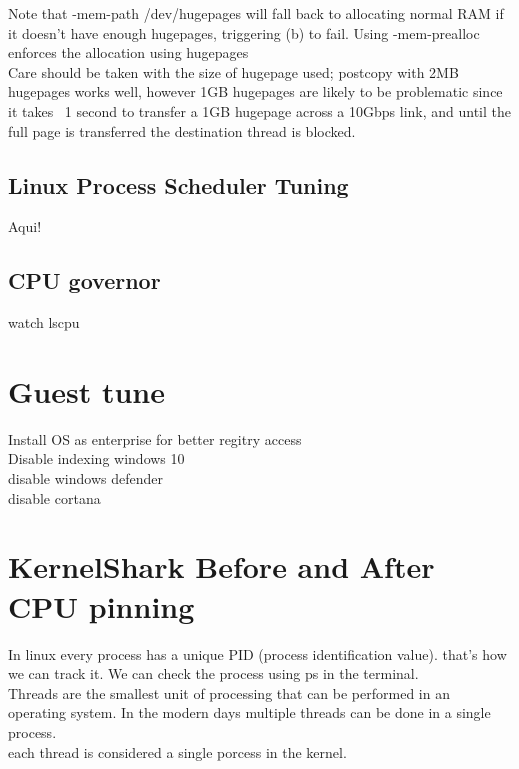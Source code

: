 \documentclass[11pt, a4paper, oneside]{article}
\theoremstyle{definition}
\begin{document}
Note that -mem-path /dev/hugepages will fall back to allocating normal RAM if it doesn’t have enough hugepages, triggering (b) to fail. Using -mem-prealloc enforces the allocation using hugepages\\

Care should be taken with the size of hugepage used; postcopy with 2MB hugepages works well, however 1GB hugepages are likely to be problematic since it takes ~1 second to transfer a 1GB hugepage across a 10Gbps link, and until the full page is transferred the destination thread is blocked.\\



\subsection{Linux Process Scheduler Tuning}

Aqui!


\subsection{CPU governor}
watch lscpu\\

\vfill
\pagebreak
\section{Guest tune}
Install OS as enterprise for better regitry access\\
Disable indexing windows 10\\
disable windows defender\\
disable cortana\\

\vfill
\pagebreak
\section{KernelShark Before and After CPU pinning}

In linux every process has a unique PID (process identification value). that's how we can track it.
We can check the process using ps in the terminal.\\
Threads are the smallest unit of processing that can be performed in an operating system. In the modern days multiple threads can be done in a single process.\\
each thread is considered a single porcess in the kernel.\\
\end{document}
